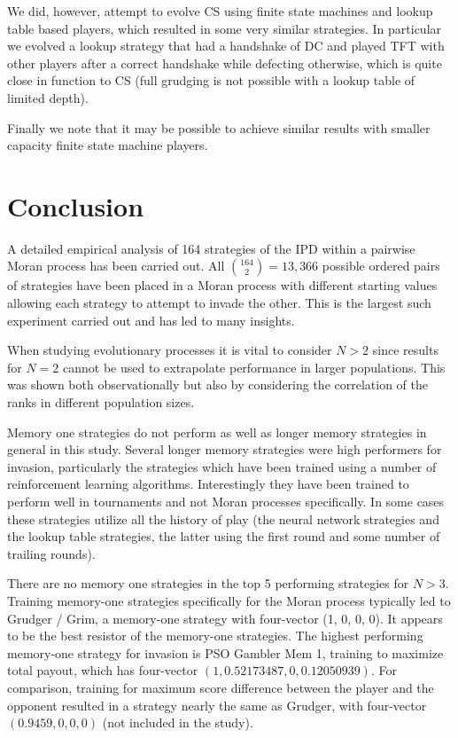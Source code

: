 \documentclass[10pt,letterpaper]{article}
\begin{document}
We did, however, attempt to evolve CS using finite state machines and lookup table
based players,
which resulted in some very similar strategies. In particular we evolved a
lookup strategy that had a handshake of DC and played TFT with other players
after a correct handshake while defecting otherwise, which is quite close in
function to CS (full grudging is not possible with a lookup table of limited
depth).

Finally we note that it may be possible to achieve similar results with smaller
capacity finite state machine players.

\section*{Conclusion}

A detailed empirical analysis of 164 strategies of the IPD within a pairwise
Moran process has been carried out. All \(\binom{164}{2}=13,366\) possible
ordered pairs of strategies have been placed in a Moran process with different
starting values allowing each strategy to attempt to invade the other.
This is the largest such experiment carried out and has led to many insights.

When studying evolutionary processes it is vital to consider \(N>2\) since
results for \(N=2\) cannot be used to extrapolate performance in larger
populations. This was shown both observationally
 but also by
considering the correlation of the ranks in different population sizes.

Memory one strategies do not perform as well as longer memory strategies in general
in this study. Several longer memory strategies were high performers for invasion,
particularly the strategies which have been trained using a number of reinforcement
learning algorithms. Interestingly they have been trained to perform well in
tournaments and not Moran processes specifically. In some cases these strategies
utilize all the history of play (the neural network strategies and the lookup
table strategies, the latter using the first round and some number of trailing rounds).

There are no memory one strategies in the top 5 performing strategies
for \(N>3\). Training memory-one strategies specifically for the Moran process
typically led to Grudger / Grim, a memory-one strategy with
four-vector (1, 0, 0, 0). It appears to be the best resistor of the memory-one strategies.
The highest performing memory-one strategy for invasion is PSO Gambler Mem 1,
training to maximize total payout, which has four-vector $(1, 0.52173487, 0, 0.12050939)$.
For comparison, training for maximum score difference between the player and the
opponent resulted in a strategy nearly the same as Grudger, with four-vector
$(0.9459, 0, 0, 0)$ (not included in the study).
\end{document}
